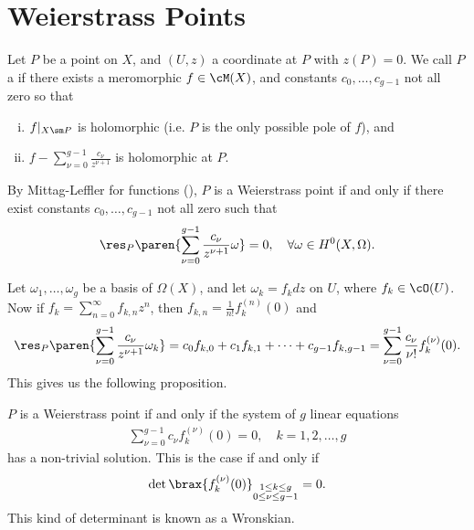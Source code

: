 \documentclass[11pt]{report}
\begin{document}
\section{Weierstrass Points}

\begin{defn}
Let $P$ be a point on $X$, and $(U,z)$ a coordinate at $P$ with $z(P)=0$. We call $P$ a  if there exists a meromorphic $f \in \cM(X)$, and constants $c_0,\dots,c_{g-1}$ not all zero so that
\begin{enumerate}[(i)]
    \item $f|_{X \sm P}$ is holomorphic (i.e. $P$ is the only possible pole of $f$), and
    \item $f - \sum_{\nu=0}^{g-1} \frac{c_\nu}{z^{\nu + 1}}$ is holomorphic at $P$.
\end{enumerate}
\end{defn}

\begin{rmk}
By Mittag-Leffler for functions (), $P$ is a Weierstrass point if and only if there exist constants $c_0,\dots,c_{g-1}$ not all zero such that
\begin{align*}
\res_P\paren{\sum_{\nu=0}^{g-1}\frac{c_\nu}{z^{\nu+1}}\omega}=0, \quad \forall \omega \in H^0(X,\Omega).
\end{align*}
\end{rmk}

Let $\omega_1,\dots,\omega_g$ be a basis of $\Omega(X)$, and let $\omega_k =f_kdz$ on $U$, where $f_k \in \cO(U)$. Now if
$f_k =\sum_{n=0}^\infty f_{k,n}z^n$, then $f_{k,n}=\frac{1}{n!}f_k^{(n)}(0)$ and
\begin{align*}
\res_P\paren{\sum_{\nu=0}^{g-1} \frac{c_\nu}{z^{\nu+1}}\omega_k} = c_0f_{k,0} + c_1f_{k,1}+ \cdots + c_{g-1}f_{k,g-1} = \sum_{\nu=0}^{g-1}\frac{c_\nu}{\nu!} f_k^{(\nu)}(0).
\end{align*}
This gives us the following proposition.
\begin{prop}
$P$ is a Weierstrass point if and only if the system of $g$ linear equations
\begin{align*}
\sum_{\nu=0}^{g-1} c_\nu f_k^{(\nu)}(0)=0, \quad k=1,2,\dots,g
\end{align*}
has a non-trivial solution. This is the case if and only if
\begin{align*}
\det \brax{f_k^{(\nu)}(0)}_{\substack{1 \leq k \leq g \\ 0 \leq \nu \leq g-1}} = 0.
\end{align*}
This kind of determinant is known as a Wronskian.
\end{prop}
\end{document}
